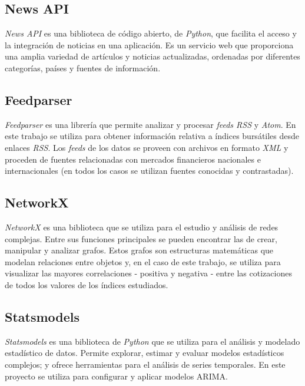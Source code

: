 \subsection{News API}\label{news_api}

\emph{News API} \citep{online:news_api} es una biblioteca de código abierto, de \emph{Python}, que facilita el acceso y
la integración de noticias en una aplicación. Es un servicio web que proporciona una amplia variedad de artículos y noticias actualizadas, ordenadas por diferentes categorías, países y fuentes de información. 

\subsection{Feedparser}\label{feedparser}

\emph{Feedparser} \citep{online:feedparser} es una librería que permite analizar y procesar \emph{feeds RSS} y \emph{Atom}. En este trabajo se utiliza para obtener información relativa a índices bursátiles desde enlaces \emph{RSS}. Los \emph{feeds} de los datos se proveen con archivos en formato \emph{XML} y proceden de fuentes relacionadas con mercados financieros nacionales e internacionales (en todos los casos se utilizan fuentes conocidas y contrastadas). 

\subsection{NetworkX}\label{networkx}

\emph{NetworkX} \citep{online:networkx} es una biblioteca que se utiliza para el estudio y análisis de redes complejas. Entre sus funciones principales se pueden encontrar las de crear, manipular y analizar grafos. Estos grafos son estructuras matemáticas que modelan relaciones entre objetos y, en el caso de  este trabajo, se utiliza para visualizar las mayores correlaciones - positiva y negativa - entre las cotizaciones de todos los valores de los índices estudiados. 

\subsection{Statsmodels}\label{statsmodels}

\emph{Statsmodels} \citep{online:statsmodels} es una biblioteca de \emph{Python} que se utiliza para el análisis y modelado estadístico de datos. Permite explorar, estimar y evaluar modelos estadísticos complejos; y ofrece herramientas para el análisis de series temporales. En este proyecto se utiliza para configurar y aplicar modelos ARIMA. 

